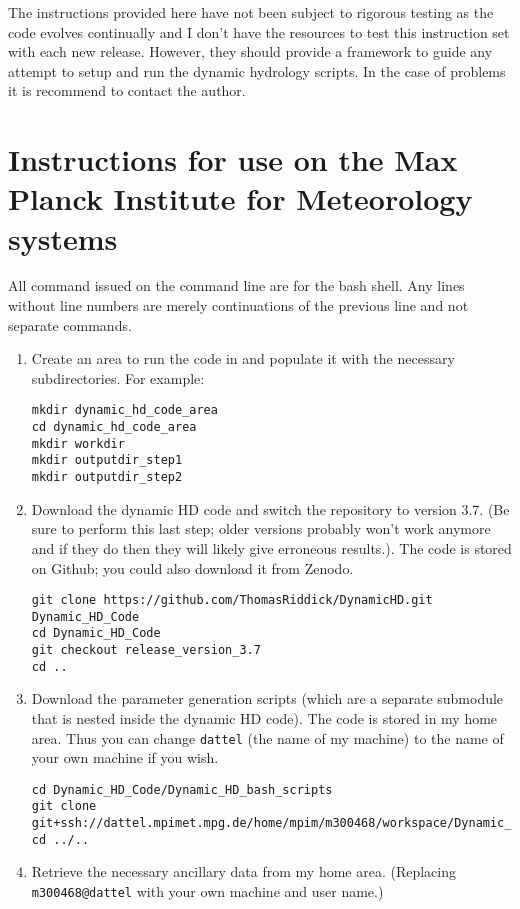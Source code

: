 \documentclass{article}
\begin{document}
The instructions provided here have not been subject to rigorous testing as the code evolves continually and I don't have the resources to test this instruction set with each new release. However, they should provide a framework to guide any attempt to setup and run the dynamic hydrology scripts. In the case of problems it is recommend to contact the author.
\section{Instructions for use on the Max Planck Institute for Meteorology systems} \label{section-max-planck-instructions}
All command issued on the command line are for the bash shell. Any lines without line numbers are merely continuations of the previous line and not separate commands.
\begin{enumerate}
\item Create an area to run the code in and populate it with the necessary subdirectories. For example:
\begin{lstlisting}[style=bash_input]
mkdir dynamic_hd_code_area
cd dynamic_hd_code_area
mkdir workdir
mkdir outputdir_step1
mkdir outputdir_step2
\end{lstlisting}
\item Download the dynamic HD code and switch the repository to version 3.7. (Be sure to perform this last step; older versions probably won't work anymore and if they do then they will likely give erroneous results.). The code is stored on Github; you could also download it from Zenodo.
\begin{lstlisting}[style=bash_input,breaklines=true]
git clone https://github.com/ThomasRiddick/DynamicHD.git Dynamic_HD_Code
cd Dynamic_HD_Code
git checkout release_version_3.7
cd ..
\end{lstlisting}
\item Download the parameter generation scripts (which are a separate submodule that is nested inside the dynamic HD code). The code is stored in my home area. Thus you can change  \lstinline[style=bash_input]{dattel} (the name of my machine) to the name of your own machine if you wish.
\begin{lstlisting}[style=bash_input,breaklines=true]
cd Dynamic_HD_Code/Dynamic_HD_bash_scripts
git clone git+ssh://dattel.mpimet.mpg.de/home/mpim/m300468/workspace/Dynamic_HD_Code/Dynamic_HD_bash_scripts/parameter_generation_scripts
cd ../..
\end{lstlisting}
\item Retrieve the necessary ancillary data from my home area. (Replacing \lstinline[style=bash_input]{m300468@dattel} with your own machine and user name.)

\end{enumerate}
\end{document}
